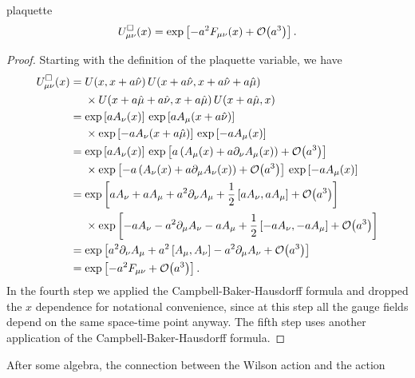 \begin{proposition}{}{plaquette}
$$
U^\Box_{\mu\nu}(x)=\exp\left[-a^2F_{\mu\nu}(x)+\order{a^3}\right].
$$
  \begin{proof}
    Starting with the definition of the plaquette variable, we have
    \begin{equation*}\begin{aligned}
      U^\Box_{\mu\nu}(x)&=U(x,x+a\hat\nu)\,U(x+a\hat\nu,x+a\hat\nu+a\hat\mu)\\
               &~~~~\times U(x+a\hat\mu+a\hat\nu,x+a\hat\mu)\,U(x+a\hat\mu,x)\\
            &=\exp\left[aA_\nu(x)\right]\,
              \exp\left[aA_\mu(x+a\hat\nu)\right]\\
               &~~~~\times\exp\left[-aA_\nu(x+a\hat\mu)\right]\,
                \exp\left[-aA_\mu(x)\right]\\
            &=\exp\left[aA_\nu(x)\right]\,
               \exp\left[a\left( A_\mu(x)+a\partial_\nu A_\mu(x) \right)
                                 +\order{a^3}\right]\\
               &~~~~\times
               \exp\left[-a\left(A_\nu(x)+a\partial_\mu A_\nu(x) \right)
                                 +\order{a^3}\right]\,
               \exp\left[-aA_\mu(x)\right]\\
            &=\exp\left[aA_\nu+aA_\mu+a^2\partial_\nu A_\mu
                 +\frac{1}{2}\left[aA_\nu,aA_\mu\right]
                 +\order{a^3}\right]\\
            &~~~~\times\exp\left[-aA_\nu-a^2\partial_\mu A_\nu-aA_\mu
                 +\frac{1}{2}\left[-aA_\nu,-aA_\mu\right]
                 +\order{a^3}\right]\\
            &=\exp\left[a^2\partial_\nu A_\mu+a^2\left[A_\mu,A_\nu\right]
                 -a^2\partial_\mu A_\nu+\order{a^3}\right]\\
            &=\exp\left[-a^2F_{\mu\nu}+\order{a^3}\right].
    \end{aligned}\end{equation*}
    In the fourth step we applied the Campbell-Baker-Hausdorff formula and
    dropped the $x$ dependence for notational convenience, since at this
    step all the gauge fields depend on the same space-time point anyway.
    The fifth step uses another application of the Campbell-Baker-Hausdorff
    formula.
  \end{proof}
\end{proposition}
After some algebra, the connection between the Wilson action and the action
